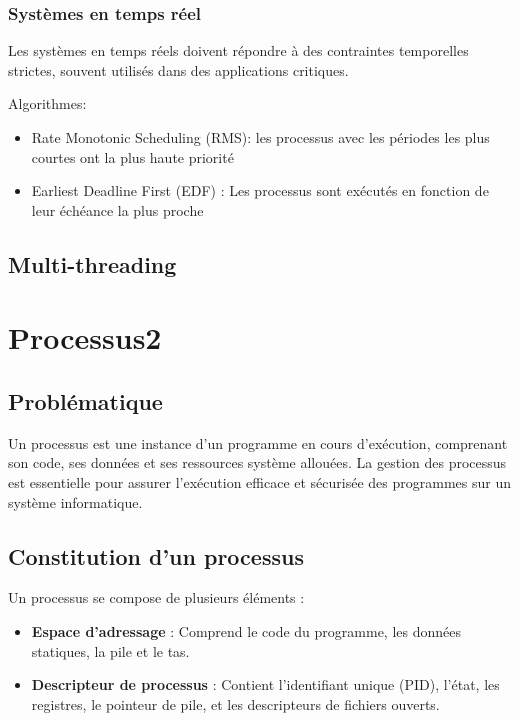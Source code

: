 \subsubsection{Systèmes en temps réel}

Les systèmes en temps réels doivent répondre à des contraintes temporelles strictes, souvent utilisés dans des applications critiques.

Algorithmes:
\begin{itemize}
    \item Rate Monotonic Scheduling (RMS): les processus avec les périodes les plus courtes ont la plus haute priorité
    \item Earliest Deadline First (EDF) : Les processus sont exécutés en fonction de leur échéance la plus proche
\end{itemize}

\subsection{Multi-threading}


\section{Processus2}\label{sec:processus2}

\subsection{Problématique}
Un processus est une instance d'un programme en cours d'exécution, comprenant son code, ses données et ses ressources système allouées. 
La gestion des processus est essentielle pour assurer l'exécution efficace et sécurisée des programmes sur un système informatique.

\subsection{Constitution d'un processus}
Un processus se compose de plusieurs éléments :
\begin{itemize}
    \item \textbf{Espace d'adressage} : Comprend le code du programme, les données statiques, la pile et le tas.
    \item \textbf{Descripteur de processus} : Contient l'identifiant unique (PID), l'état, les registres, le pointeur de pile, et les descripteurs de fichiers ouverts.
\end{itemize}

